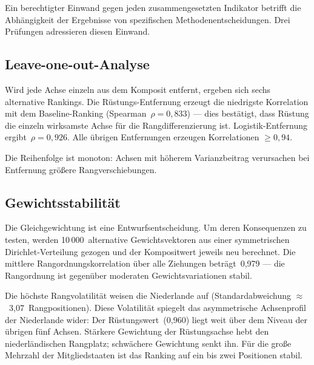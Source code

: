 \begin{sloppypar}
Ein berechtigter Einwand gegen jeden zusammengesetzten Indikator
betrifft die Abh\"angigkeit der Ergebnisse von spezifischen
Methoden\-entscheidungen.  Drei Pr\"ufungen adressieren diesen
Einwand.
\end{sloppypar}

\subsection{Leave-one-out-Analyse}

\begin{sloppypar}
Wird jede Achse einzeln aus dem Komposit entfernt, ergeben sich
sechs alternative Rankings.  Die R\"ustungs-Entfernung erzeugt die
niedrigste Korrelation mit dem Baseline-Ranking
(Spearman~$\rho = 0{,}833$) --- dies best\"atigt, dass R\"ustung
die einzeln wirksamste Achse f\"ur die Rang\-differenzierung ist.
Logistik-Entfernung ergibt~$\rho = 0{,}926$.  Alle \"ubrigen
Entfernungen erzeugen Korrelationen $\geq 0{,}94$.
\end{sloppypar}

Die Reihenfolge ist monoton: Achsen mit h\"oherem Varianzbeitrag
verursachen bei Entfernung gr\"o\ss ere Rangverschiebungen.

\subsection{Gewichtsstabilit\"at}

\begin{sloppypar}
Die Gleichgewichtung ist eine Entwurfs\-entscheidung.  Um deren
Konsequenzen zu testen, werden 10\,000~alternative
Gewichts\-vektoren aus einer symmetrischen Dirichlet-Verteilung
gezogen und der Kompositwert jeweils neu berechnet.  Die mittlere
Rang\-ordnungs\-korrelation \"uber alle Ziehungen
betr\"agt~0{,}979 --- die Rangordnung ist gegen\"uber moderaten
Gewichts\-variationen stabil.
\end{sloppypar}

\begin{sloppypar}
Die h\"ochste Rang\-volatilit\"at weisen die Niederlande auf
(Standard\-abweichung $\approx$~3{,}07~Rang\-positionen).  Diese
Volatilit\"at spiegelt das asymmetrische Achsen\-profil der
Niederlande wider: Der R\"ustungswert~(0{,}960) liegt weit \"uber
dem Niveau der \"ubrigen f\"unf Achsen.  St\"arkere Gewichtung der
R\"ustungsachse hebt den niederl\"andischen Rangplatz; schw\"achere
Gewichtung senkt ihn.  F\"ur die gro\ss e Mehrzahl der
Mitgliedstaaten ist das Ranking auf ein bis zwei Positionen stabil.
\end{sloppypar}

